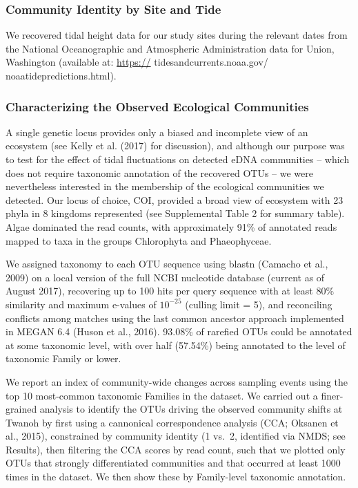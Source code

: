 \documentclass[fleqn,10pt,lineno]{wlpeerj} %
\begin{document}
\subsubsection{Community Identity by Site and
Tide}\label{community-identity-by-site-and-tide}

We recovered tidal height data for our study sites during the relevant
dates from the National Oceanographic and Atmospheric Administration
data for Union, Washington (available at: \url{https://}
tidesandcurrents.noaa.gov/ noaatidepredictions.html).

\subsubsection{Characterizing the Observed Ecological
Communities}\label{characterizing-the-observed-ecological-communities}

A single genetic locus provides only a biased and incomplete view of an
ecosystem (see Kelly et al. (2017) for discussion), and although our
purpose was to test for the effect of tidal fluctuations on detected
eDNA communities -- which does not require taxonomic annotation of the
recovered OTUs -- we were nevertheless interested in the membership of
the ecological communities we detected. Our locus of choice, COI,
provided a broad view of ecosystem with 23 phyla in 8 kingdoms
represented (see Supplemental Table 2 for summary table). Algae
dominated the read counts, with approximately 91\% of annotated reads
mapped to taxa in the groups Chlorophyta and Phaeophyceae.

We assigned taxonomy to each OTU sequence using blastn (Camacho et al.,
2009) on a local version of the full NCBI nucleotide database (current
as of August 2017), recovering up to 100 hits per query sequence with at
least 80\% similarity and maximum e-values of \(10^{-25}\) (culling
limit = 5), and reconciling conflicts among matches using the last
common ancestor approach implemented in MEGAN 6.4 (Huson et al., 2016).
93.08\% of rarefied OTUs could be annotated at some taxonomic level,
with over half (57.54\%) being annotated to the level of taxonomic
Family or lower.

We report an index of community-wide changes across sampling events
using the top 10 most-common taxonomic Families in the dataset. We
carried out a finer-grained analysis to identify the OTUs driving the
observed community shifts at Twanoh by first using a cannonical
correspondence analysis (CCA; Oksanen et al., 2015), constrained by
community identity (1 vs.~2, identified via NMDS; see Results), then
filtering the CCA scores by read count, such that we plotted only OTUs
that strongly differentiated communities and that occurred at least 1000
times in the dataset. We then show these by Family-level taxonomic
annotation.
\end{document}
